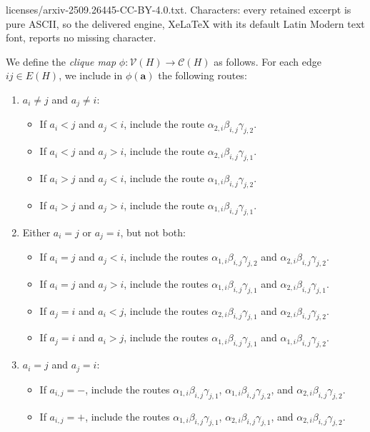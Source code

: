 \documentclass[10pt,a4paper]{amsart}
\newcommand\ba{\mathbf{a}}
\newcommand{\cliques}{\mathcal{C}}
\newcommand{\cliquevs}{\mathcal{V}}
\begin{document}
licenses/arxiv-2509.26445-CC-BY-4.0.txt. Characters: every retained excerpt is pure ASCII, so the delivered engine, XeLaTeX with its default Latin Modern text font, reports no missing character.
\begin{definition}\label{def:cliquemap}
    We define the \emph{clique map} $\phi:\cliquevs(H)\to \cliques(H)$ as follows.
    For each edge $ij\in E(H)$, we include in $\phi(\ba)$ the following routes:
    \begin{enumerate}
    \item[(i)] $a_i\neq j$ and $a_j\neq i$:
        \begin{itemize}
        \item If $a_i<j$ and $a_j<i$, include the route $\alpha_{2,i}\beta_{i,j}\gamma_{j,2}$.
        \item If $a_i<j$ and $a_j>i$, include the route $\alpha_{2,i}\beta_{i,j}\gamma_{j,1}$.
        \item If $a_i>j$ and $a_j<i$, include the route $\alpha_{1,i}\beta_{i,j}\gamma_{j,2}$.
        \item If $a_i>j$ and $a_j>i$, include the route $\alpha_{1,i}\beta_{i,j}\gamma_{j,1}$.
        \end{itemize}
        \item[(ii)] Either $a_i=j$ or $a_j=i$, but not both:
        \begin{itemize}
        \item If $a_i=j$ and $a_j<i$, include the routes $\alpha_{1,i}\beta_{i,j}\gamma_{j,2}$ and $\alpha_{2,i}\beta_{i,j}\gamma_{j,2}$.
        \item If $a_i=j$ and $a_j>i$, include the routes $\alpha_{1,i}\beta_{i,j}\gamma_{j,1}$ and $\alpha_{2,i}\beta_{i,j}\gamma_{j,1}$.
        \item If $a_j=i$ and $a_i<j$, include the routes $\alpha_{2,i}\beta_{i,j}\gamma_{j,1}$ and $\alpha_{2,i}\beta_{i,j}\gamma_{j,2}$.
        \item If $a_j=i$ and $a_i>j$, include the routes $\alpha_{1,i}\beta_{i,j}\gamma_{j,1}$ and $\alpha_{1,i}\beta_{i,j}\gamma_{j,2}$.
        \end{itemize}
        \item[(iii)] $a_i=j$ and $a_j=i$:
    \begin{itemize}
        \item If $a_{i,j}=-$, include the routes $\alpha_{1,i}\beta_{i,j}\gamma_{j,1}$, $\alpha_{1,i}\beta_{i,j}\gamma_{j,2}$, and $\alpha_{2,i}\beta_{i,j}\gamma_{j,2}$.
        \item If $a_{i,j}=+$, include the routes $\alpha_{1,i}\beta_{i,j}\gamma_{j,1}$, $\alpha_{2,i}\beta_{i,j}\gamma_{j,1}$, and $\alpha_{2,i}\beta_{i,j}\gamma_{j,2}$.
        \end{itemize}
    \end{enumerate}
\end{definition}
\end{document}
